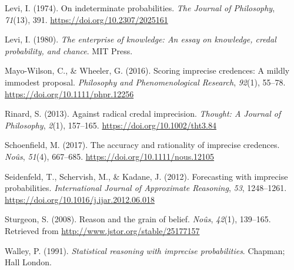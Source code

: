 \documentclass[
  letterpaper,
  DIV=11,
  numbers=noendperiod]{scrartcl}
\newlength{\cslhangindent}
\newlength{\cslentryspacingunit} %
\newenvironment{CSLReferences}[2] %
 {%
  \setlength{\parindent}{0pt}
  \ifodd #1
  \let\oldpar\par
  \def\par{\hangindent=\cslhangindent\oldpar}
  \fi
  \setlength{\parskip}{#2\cslentryspacingunit}
 }%
 {}
\begin{document}
\begin{CSLReferences}{1}{0}
\leavevmode{}%
Levi, I. (1974). On indeterminate probabilities. \emph{The Journal of
Philosophy}, \emph{71}(13), 391. \url{https://doi.org/10.2307/2025161}

\leavevmode{}%
Levi, I. (1980). \emph{The enterprise of knowledge: An essay on
knowledge, credal probability, and chance}. MIT Press.

\leavevmode{}%
Mayo-Wilson, C., \& Wheeler, G. (2016). Scoring imprecise credences: A
mildly immodest proposal. \emph{Philosophy and Phenomenological
Research}, \emph{92}(1), 55--78.
\url{https://doi.org/10.1111/phpr.12256}

\leavevmode{}%
Rinard, S. (2013). Against radical credal imprecision. \emph{Thought: A
Journal of Philosophy}, \emph{2}(1), 157--165.
\url{https://doi.org/10.1002/tht3.84}

\leavevmode{}%
Schoenfield, M. (2017). The accuracy and rationality of imprecise
credences. \emph{Noûs}, \emph{51}(4), 667--685.
\url{https://doi.org/10.1111/nous.12105}

\leavevmode{}%
Seidenfeld, T., Schervish, M., \& Kadane, J. (2012). Forecasting with
imprecise probabilities. \emph{International Journal of Approximate
Reasoning}, \emph{53}, 1248--1261.
\url{https://doi.org/10.1016/j.ijar.2012.06.018}

\leavevmode{}%
Sturgeon, S. (2008). Reason and the grain of belief. \emph{No{û}s},
\emph{42}(1), 139--165. Retrieved from
\url{http://www.jstor.org/stable/25177157}

\leavevmode{}%
Walley, P. (1991). \emph{Statistical reasoning with imprecise
probabilities}. Chapman; Hall London.

\end{CSLReferences}
\end{document}
